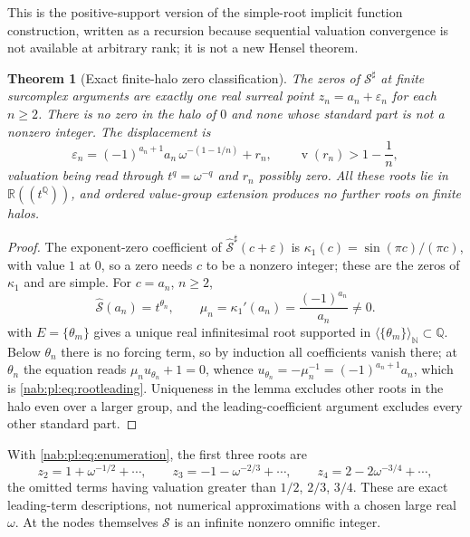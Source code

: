 \documentclass[11pt,letterpaper]{article}
\newtheorem{theorem}{Theorem}[section]
\theoremstyle{definition}
\theoremstyle{remark}
\newcommand{\R}{\mathbb R}
\newcommand{\Q}{\mathbb Q}
\newcommand{\N}{\mathbb N}
\newcommand{\val}{\operatorname{v}}
\newcommand{\angles}[1]{\langle #1\rangle_{\N}}
\numberwithin{equation}{section}
\begin{document}
This is the positive-support version of the simple-root implicit function
construction, written as a recursion because sequential valuation convergence
is not available at arbitrary rank; it is not a new Hensel theorem.

\begin{theorem}[Exact finite-halo zero classification]\label{nab:pl:thm:zeros}
The zeros of $\mathcal S^\sharp$ at finite surcomplex arguments are exactly one
real surreal point $z_n=a_n+\varepsilon_n$ for each $n\geq2$. There is no zero
in the halo of $0$ and none whose standard part is not a nonzero integer. The
displacement is
\begin{equation}\label{nab:pl:eq:rootleading}
 \varepsilon_n=(-1)^{a_n+1}a_n\,\omega^{-(1-1/n)}+r_n,\qquad
 \val(r_n)>1-\frac1n,
\end{equation}
valuation being read through $t^q=\omega^{-q}$ and $r_n$ possibly zero. All
these roots lie in $\R((t^\Q))$, and ordered value-group extension produces no
further roots on finite halos.
\end{theorem}

\begin{proof}
The exponent-zero coefficient of $\widehat{\mathcal S}^\sharp(c+\varepsilon)$
is $\kappa_1(c)=\sin(\pi c)/(\pi c)$, with value $1$ at $0$, so a zero needs
$c$ to be a nonzero integer; these are the zeros of $\kappa_1$ and are simple.
For $c=a_n$, $n\geq2$,
\begin{equation}\label{nab:pl:eq:forcing}
 \widehat{\mathcal S}(a_n)=t^{\theta_n},\qquad
 \mu_n=\kappa_1'(a_n)=\frac{(-1)^{a_n}}{a_n}\neq0 .
\end{equation}
 with $E=\{\theta_m\}$ gives a unique real
infinitesimal root supported in $\angles{\{\theta_m\}}\subset\Q$. Below
$\theta_n$ there is no forcing term, so by induction all coefficients vanish
there; at $\theta_n$ the equation reads $\mu_nu_{\theta_n}+1=0$, whence
$u_{\theta_n}=-\mu_n^{-1}=(-1)^{a_n+1}a_n$, which is
\eqref{nab:pl:eq:rootleading}. Uniqueness in the lemma excludes other roots in
the halo even over a larger group, and the leading-coefficient argument
excludes every other standard part.
\end{proof}

With \eqref{nab:pl:eq:enumeration}, the first three roots are
\[
 z_2=1+\omega^{-1/2}+\cdots,\qquad
 z_3=-1-\omega^{-2/3}+\cdots,\qquad
 z_4=2-2\omega^{-3/4}+\cdots,
\]
the omitted terms having valuation greater than $1/2$, $2/3$, $3/4$. These are
exact leading-term descriptions, not numerical approximations with a chosen
large real $\omega$. At the nodes themselves $\mathcal S$ is an infinite
nonzero omnific integer.
\end{document}
